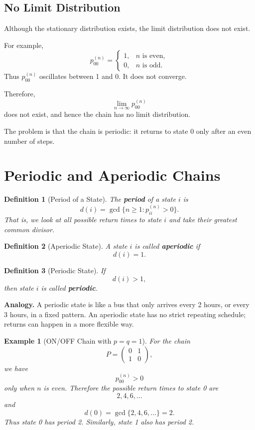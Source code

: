 \documentclass[12pt,a4paper]{article}
\theoremstyle{lecturestyle}
\newtheorem{definition}{Definition}
\newtheorem{example}{Example}
\begin{document}
\subsection{No Limit Distribution}

Although the stationary distribution exists, the limit distribution does not exist.

For example,
\[
p_{00}^{(n)}
=
\begin{cases}
1, & n \text{ is even},\\
0, & n \text{ is odd}.
\end{cases}
\]
Thus $p_{00}^{(n)}$ oscillates between 1 and 0. It does not converge.

Therefore,
\[
\lim_{n\to\infty}p_{00}^{(n)}
\]
does not exist, and hence the chain has no limit distribution.

The problem is that the chain is periodic: it returns to state 0 only after an even number of steps.

\section{Periodic and Aperiodic Chains}

\begin{definition}[Period of a State]
The \textbf{period} of a state $i$ is
\[
d(i)=\gcd\{n\geq 1:p_{ii}^{(n)}>0\}.
\]
That is, we look at all possible return times to state $i$ and take their greatest common divisor.
\end{definition}

\begin{definition}[Aperiodic State]
A state $i$ is called \textbf{aperiodic} if
\[
d(i)=1.
\]
\end{definition}

\begin{definition}[Periodic State]
If
\[
d(i)>1,
\]
then state $i$ is called \textbf{periodic}.
\end{definition}

\textbf{Analogy.} A periodic state is like a bus that only arrives every 2 hours, or every 3 hours, in a fixed pattern. An aperiodic state has no strict repeating schedule; returns can happen in a more flexible way.

\begin{example}[ON/OFF Chain with $p=q=1$]
For the chain
\[
P=
\begin{pmatrix}
0 & 1\\
1 & 0
\end{pmatrix},
\]
we have
\[
p_{00}^{(n)}>0
\]
only when $n$ is even. Therefore the possible return times to state 0 are
\[
2,4,6,\ldots
\]
and
\[
d(0)=\gcd\{2,4,6,\ldots\}=2.
\]
Thus state 0 has period 2. Similarly, state 1 also has period 2.
\end{example}
\end{document}
